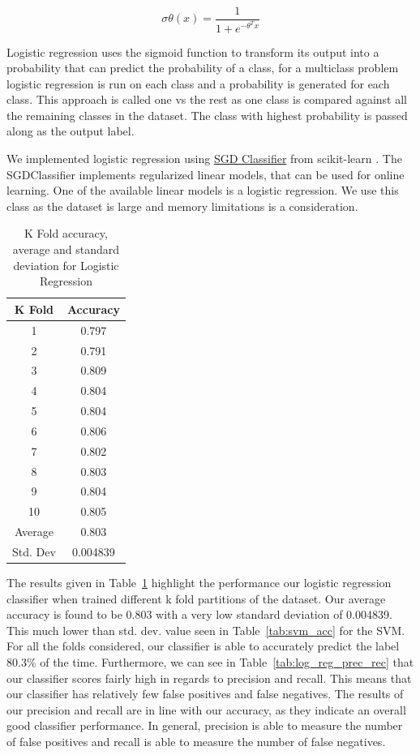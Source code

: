 \documentclass[12pt]{article}
\begin{document}
\begin{equation}
    \sigma\theta (x) =  \frac{\mathrm{1} }{\mathrm{1} + e^{- \theta^Tx} } 
\end{equation}

Logistic regression uses the sigmoid function to transform its output into a probability that can predict the probability of a class, for a multiclass problem logistic regression is run on each class and a probability is generated for each class. This approach is called one vs the rest as one class is compared against all the remaining classes in the dataset. The class with highest probability is passed along as the output label.

We implemented logistic regression using \href{https://scikit-learn.org/stable/modules/generated/sklearn.linear_model.SGDClassifier.html}{SGD Classifier} from scikit-learn \cite{sklearn}. The SGDClassifier implements regularized linear models, that can be used for online learning. One of the available linear models is a logistic regression. We use this class as the dataset is large and memory limitations is a consideration. \\

\begin{table}[H]
\centering
\begin{tabular}{|c|c|}
\hline
K Fold & Accuracy \\ \hline
1       & 0.797   \\ 
2       & 0.791   \\ 
3       & 0.809   \\ 
4       & 0.804   \\ 
5       & 0.804   \\ 
6       & 0.806   \\ 
7      & 0.802    \\ 
8       & 0.803   \\ 
9       & 0.804   \\ 
10       & 0.805   \\ 
\hline
Average & 0.803 \\ 
Std. Dev & 0.004839 \\ \hline
\end{tabular}
\caption{K Fold accuracy, average and standard deviation for Logistic Regression}\label{tab:log_reg_acc}
\end{table}

The results given in Table~\ref{tab:log_reg_acc} highlight the performance our logistic regression classifier when trained different k fold partitions of the dataset. Our average accuracy is found to be 0.803 with a very low standard deviation of 0.004839. This much lower than std. dev. value seen in Table~\ref{tab:svm_acc} for the SVM. For all the folds considered, our classifier is able to accurately predict the label 80.3\% of the time. Furthermore, we can see in Table~\ref{tab:log_reg_prec_rec} that our classifier scores fairly high in regards to precision and recall. This means that our classifier has relatively few false positives and false negatives. The results of our precision and recall are in line with our accuracy, as they indicate an overall good classifier performance. In general, precision is able to measure the number of false positives and recall is able to measure the number of false negatives.
\end{document}
